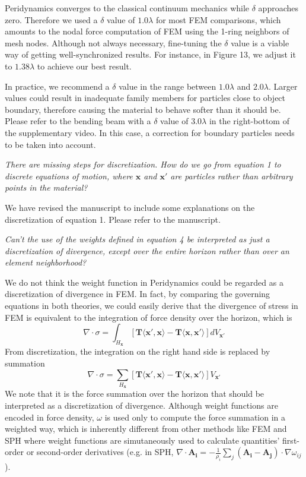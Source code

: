 Peridynamics converges to the classical continuum mechanics while $\delta$ approaches zero\cite{Weckner2005705}. Therefore we used a $\delta$ value of $1.0\lambda$ for most FEM comparisons, which amounts to the nodal force computation of FEM using the 1-ring neighbors of mesh nodes. Although not always necessary, fine-tuning the $\delta$ value is a viable way of getting well-synchronized results. For instance, in Figure 13, we adjust it to $1.38\lambda$ to achieve our best result.

In practice, we recommend a $\delta$ value in the range between $1.0\lambda$ and $2.0\lambda$.
Larger values could result in inadequate family members for particles close to object boundary, therefore causing the material to behave softer than it should be. Please refer to the bending beam with a $\delta$ value of $3.0\lambda$ in the right-bottom of the supplementary video. In this case, a correction for boundary particles needs to be taken into account.

\emph{There are missing steps for discretization. How do we go from equation 1 to discrete equations of motion, where $\mathbf{x}$ and $\mathbf{x'}$ are particles rather than arbitrary points in the material? }

We have revised the manuscript to include some explanations on the discretization of equation 1. Please refer to the manuscript.

\emph{Can't the use of the weights defined in equation 4 be interpreted as just a discretization of divergence, except over the entire horizon rather than over an element neighborhood?}

We do not think the weight function in Peridynamics could be regarded as a discretization of divergence in FEM.
In fact, by comparing the governing equations in both theories, we could easily derive that
the divergence of stress in FEM is equivalent to the integration of force density over the horizon, which is
\begin{equation*}
\nabla\cdot\sigma = \int_{H_\mathbf{x}}[\mathbf{T}\langle\mathbf{x}',\mathbf{x}\rangle - \mathbf{T}\langle\mathbf{x},\mathbf{x}'\rangle]dV_{\mathbf{x}'}
\end{equation*}
From discretization, the integration on the right hand side is replaced by summation
\begin{equation*}
\nabla\cdot\sigma = \sum_{H_\mathbf{x}}[\mathbf{T}\langle\mathbf{x}',\mathbf{x}\rangle - \mathbf{T}\langle\mathbf{x},\mathbf{x}'\rangle]V_{\mathbf{x}'}
\end{equation*}
We note that it is the force summation over the horizon that should be interpreted as a discretization of divergence.
Although weight functions are encoded in force density, $\omega$ is used only to compute the force summation in a weighted way, which is inherently different from other methods like FEM and SPH where weight functions are simutaneously used to calculate quantities' first-order or second-order derivatives
(e.g. in SPH, $\nabla\cdot\mathbf{A_i} = -\frac{1}{\rho_i}\sum_j(\mathbf{A_i - A_j})\cdot\nabla\omega_{ij}$).

